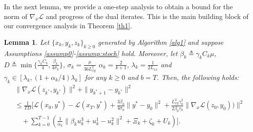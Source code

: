 \documentclass[letterpaper,11 pt]{article}
\newtheorem{lemma}{Lemma}
\def\ml{\mathcal L}
\newcommand{\zal}[1]{{\color{black}#1}}
\begin{document}
In the next lemma, we provide a one-step analysis to obtain a bound for the norm of $\nabla_x\ml$ and progress of the dual iterates. This is the main building block of our convergence analysis in Theorem \ref{th1}.
\begin{lemma}\label{lemmath1}
Let $\{x_k, y_{k},z_k\}_{{k} \geq0}$ generated by Algorithm \ref{alg1} and suppose Assumptions \ref{assump0}-\ref{assump:stoch} hold.
 Moreover, let $\beta_k\triangleq\gamma_kC_k\mu$, $D\triangleq {\min \{{\tfrac{{\gamma_k C_k}}{4}, \tfrac{\beta_k}{{4\sigma_k}}}}\}$, $\sigma_k= \tfrac{\mu}{36L^2_{xy}}$ $\alpha_k=\tfrac{2}{k+1}$, $\lambda_k=\tfrac{1}{2L_{xx}}$ and $\gamma_k\in [\lambda_k,(1+\alpha_k/4)\lambda_k]$ for any $k\geq 0$ and $b=T$. Then, the following holds:
 \begin{align}\label{lemma_result}
  &\|\nabla_x \ml(z_{k^*},y_{k^*})\|^2+\|y_{k^*+1}-y_{k^*}\|^2\\
  &\leq \nonumber \tfrac{1}{TD}\biggr[ \ml(x_0,y^*)-\ml(x_T,y^*) +\tfrac{3\beta_0}{4\sigma_0}\|y^*-y_0\|^2 + \tfrac{{L^2_{xy}}\gamma_0^2}{2\beta_0\tau_0}\|\nabla_x \ml(z_0,y_0))\|^2\\\nonumber
  &\quad+\sum_{k=0}^{T-1}\left(\tfrac{1}{\bar \alpha_k} {\|\beta_k u_k^3+u_k^1-u_k^2\|^2}+\Xi_k+\zeta_k+U_k\right)\biggr].
\end{align}
\end{lemma}
\end{document}
